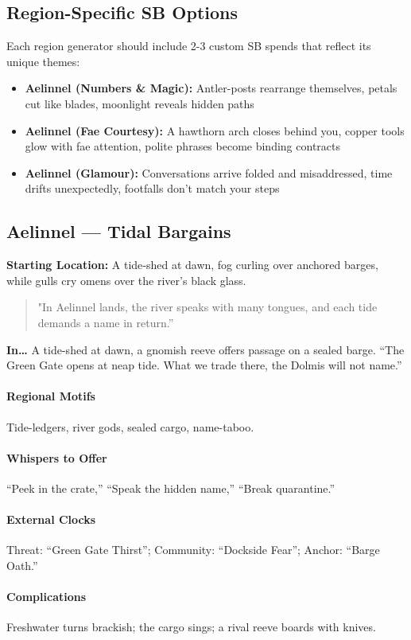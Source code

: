 \subsection*{Region-Specific SB Options}
Each region generator should include 2-3 custom SB spends that reflect its unique themes:

\begin{itemize}
\item \textbf{Aelinnel (Numbers \& Magic):} Antler-posts rearrange themselves, petals cut like blades, moonlight reveals hidden paths
\item \textbf{Aelinnel (Fae Courtesy):} A hawthorn arch closes behind you, copper tools glow with fae attention, polite phrases become binding contracts
\item \textbf{Aelinnel (Glamour):} Conversations arrive folded and misaddressed, time drifts unexpectedly, footfalls don't match your steps
\end{itemize}

\subsection*{Aelinnel — Tidal Bargains}
\textbf{Starting Location:} A tide‑shed at dawn, fog curling over anchored barges, while gulls cry omens over the river’s black glass.
\begin{quote}
"In Aelinnel lands, the river speaks with many tongues, and each tide demands a name in return.”
\end{quote}

\textbf{In…} A tide-shed at dawn, a gnomish reeve offers passage on a sealed barge. ``The Green Gate opens at neap tide. What we trade there, the Dolmis will not name.''
\paragraph{Regional Motifs} Tide-ledgers, river gods, sealed cargo, name-taboo.
\paragraph{Whispers to Offer} ``Peek in the crate,'' ``Speak the hidden name,'' ``Break quarantine.''
\paragraph{External Clocks} Threat: ``Green Gate Thirst''; Community: ``Dockside Fear''; Anchor: ``Barge Oath.''
\paragraph{Complications} Freshwater turns brackish; the cargo sings; a rival reeve boards with knives.
